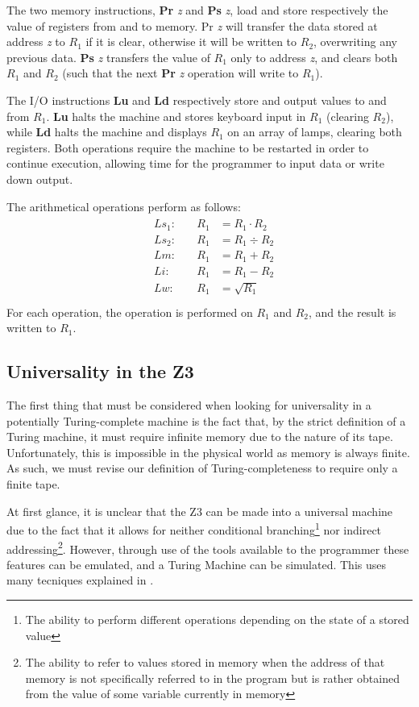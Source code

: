 \documentclass[Master.tex]{subfiles}
\begin{document}
The two memory instructions, \textbf{Pr} \textit{z} and \textbf{Ps} \textit{z}, load and store respectively the value of registers from and to memory. Pr \textit{z} will transfer the data stored at address \textit{z} to $R_1$ if it is clear, otherwise it will be written to $R_2$, overwriting any previous data. \textbf{Ps} \textit{z} transfers the value of $R_1$ only to address \textit{z}, and clears both $R_1$ and $R_2$ (such that the next \textbf{Pr} \textit{z} operation will write to $R_1$). 

The I/O instructions \textbf{Lu} and \textbf{Ld} respectively store and output values to and from $R_1$. \textbf{Lu} halts the machine and stores keyboard input in $R_1$ (clearing $R_2$), while \textbf{Ld} halts the machine and displays $R_1$ on an array of lamps, clearing both registers. Both operations require the machine to be restarted in order to continue execution, allowing time for the programmer to input data or write down output.

The arithmetical operations perform as follows:
\begin{gather*}
\begin{aligned}
&Ls_1:\quad	&R_1 &= R_1 \cdot R_2 \\
&Ls_2:\quad	&R_1 &= R_1 \div R_2 \\
&Lm:\quad	&R_1 &= R_1 + R_2 \\
&Li:\quad	&R_1 &= R_1 - R_2 \\
&Lw:\quad	&R_1 &= \sqrt{R_1} \\
\end{aligned}
\end{gather*}
For each operation, the operation is performed on $R_1$ and $R_2$, and the result is written to $R_1$. 
\subsection{Universality in the Z3}

The first thing that must be considered when looking for universality in a potentially Turing-complete machine is the fact that, by the strict definition of a Turing machine, it must require infinite memory due to the nature of its tape. Unfortunately, this is impossible in the physical world as memory is always finite. As such, we must revise our definition of Turing-completeness to require only a finite tape.

At first glance, it is unclear that the Z3 can be made into a universal machine due to the fact that it allows for neither conditional branching\footnote{The ability to perform different operations depending on the state of a stored value} nor indirect addressing\footnote{The ability to refer to values stored in memory when the address of that memory is not specifically referred to in the program but is rather obtained from the value of some variable currently in memory}. However, through use of the tools available to the programmer these features can be emulated, and a Turing Machine can be simulated. This uses many tecniques explained in \cite{rojas1998z3universal}.
\end{document}
